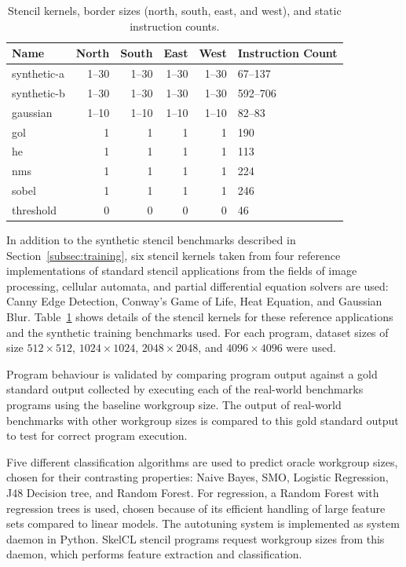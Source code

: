 \documentclass[preprint,nonatbib,10pt]{sigplanconf}
\begin{document}
\begin{table}
\scriptsize
\centering
\begin{tabular}{lrrrrp{1.3cm}}
\toprule
      Name &  North &  South &  East &  West &  Instruction Count \\
\midrule
   synthetic-a & 1--30 & 1--30 & 1--30 & 1--30 & 67--137\\
   synthetic-b & 1--30 & 1--30 & 1--30 & 1--30 & 592--706\\
   gaussian    & 1--10 & 1--10 & 1--10 & 1--10 & 82--83 \\
   gol         &      1 &      1 &     1 &     1 &                190 \\
   he          &      1 &      1 &     1 &     1 &                113 \\
   nms         &      1 &      1 &     1 &     1 &                224 \\
   sobel       &      1 &      1 &     1 &     1 &                246 \\
   threshold   &      0 &      0 &     0 &     0 &                 46 \\
\bottomrule
\end{tabular}
\caption{%
  Stencil kernels, border sizes (north, south, east, and west),
  and static instruction counts.
}
\label{tab:kernels}
\end{table}

In addition to the synthetic stencil benchmarks described in
Section~\ref{subsec:training}, six stencil kernels taken from four
reference implementations of standard stencil applications from the
fields of image processing, cellular automata, and partial
differential equation solvers are used: Canny Edge Detection, Conway's
Game of Life, Heat Equation, and Gaussian
Blur. Table~\ref{tab:kernels} shows details of the stencil kernels for
these reference applications and the synthetic training benchmarks
used. For each program, dataset sizes of size $512\times512$,
$1024\times1024$, $2048\times2048$, and $4096\times4096$ were used.

Program behaviour is validated by comparing program output against a
gold standard output collected by executing each of the real-world
benchmarks programs using the baseline workgroup size. The output of
real-world benchmarks with other workgroup sizes is compared to this
gold standard output to test for correct program execution.

Five different classification algorithms are used to predict oracle
workgroup sizes, chosen for their contrasting properties: Naive Bayes,
SMO, Logistic Regression, J48 Decision tree, and Random Forest. For
regression, a Random Forest with regression trees is used, chosen
because of its efficient handling of large feature sets compared to
linear models. The autotuning system is implemented as system daemon
in Python. SkelCL stencil programs request workgroup sizes from this
daemon, which performs feature extraction and classification.
\end{document}
